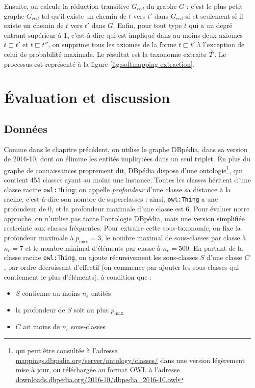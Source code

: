 Ensuite, on calcule la réduction transitive $G_{red}$ du graphe $G$ : c'est le plus petit graphe $G_{red}$ tel qu'il existe un chemin de $t$ vers $t'$ dans $G_{red}$ si et seulement si il existe un chemin de $t$ vers $t'$ dans $G$. Enfin, pour tout type $t$ qui a un degré entrant supérieur à 1, c'est-à-dire qui est impliqué dans au moins deux axiomes $t \sqsubset t'$ et $t\sqsubset t''$, on supprime tous les axiomes de la forme $t \sqsubset t'$ à l'exception de celui de probabilité maximale. Le résultat est la taxonomie extraite $\hat{T}$. Le processus est représenté à la figure \ref{fig:softmapping-extraction}.


\section{Évaluation et discussion}
\label{sec:te-evaluation}

\subsection{Données}
\label{sec:te-data}

Comme dans le chapitre précédent, on utilise le graphe DBpédia, dans sa version de 2016-10, dont on élimine les entités impliquées dans un seul triplet. En plus du graphe de connaissances proprement dit, DBpédia dispose d'une ontologie\footnote{qui peut être consultée à l'adresse \href{http://mappings.dbpedia.org/server/ontology/classes/}{mappings.dbpedia.org/server/ontology/classes/} dans une version légèrement mise à jour, ou téléchargée au format OWL à l'adresse \href{http://downloads.dbpedia.org/2016-10/dbpedia\_2016-10.owl}{downloads.dbpedia.org/2016-10/dbpedia\_2016-10.owl}}, qui contient 455 classes ayant au moins une instance. Toutes les classes héritent d'une classe racine \texttt{owl:Thing}; on appelle \textit{profondeur} d'une classe sa distance à la racine, c'est-à-dire son nombre de superclasses : ainsi, \texttt{owl:Thing} a une profondeur de 0, et la profondeur maximale d'une classe est 6. Pour évaluer notre approche, on n'utilise pas toute l'ontologie DBpédia, mais une version simplifiée restreinte aux classes fréquentes. %
Pour extraire cette sous-taxonomie, on fixe la profondeur maximale à $p_{\max}=3$, le nombre maximal de sous-classes par classe à $n_c=7$ et le nombre minimal d'éléments par classe à $n_e=500$. En partant de la classe racine \texttt{owl:Thing}, on ajoute récursivement les sous-classes $S$ d'une classe $C$, par ordre décroissant d'effectif (on commence par ajouter les sous-classes qui contiennent le plus d'éléments), à condition que : 
\begin{itemize}
    \item $S$ contienne au moins $n_e$ entités
    \item la profondeur de $S$ soit au plus $p_{\max}$
    \item $C$ ait moins de $n_c$ sous-classes
\end{itemize}

